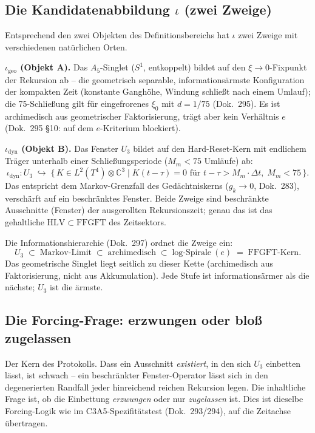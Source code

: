 \subsection*{Die Kandidatenabbildung $\iota$ (zwei Zweige)}

Entsprechend den zwei Objekten des Definitionsbereichs hat $\iota$ zwei
Zweige mit verschiedenen natürlichen Orten.

\textbf{$\iota_{\text{geo}}$ (Objekt A).} Das $A_5$-Singlet ($S^1$,
entkoppelt) bildet auf den $\xi\to 0$-Fixpunkt der Rekursion ab -- die
geometrisch separable, informationsärmste Konfiguration der kompakten Zeit
(konstante Ganghöhe, Windung schließt nach einem Umlauf); die 75-Schließung gilt für eingefrorenes $\xi_0$ mit
$d=1/75$ (Dok.~295). Es ist archimedisch aus
geometrischer Faktorisierung, trägt aber kein Verhältnis $e$ (Dok.~295 §10:
auf dem $e$-Kriterium blockiert).

\textbf{$\iota_{\text{dyn}}$ (Objekt B).} Das Fenster $U_3$ bildet auf den
Hard-Reset-Kern mit endlichem Träger unterhalb einer Schließungsperiode
($M_m < 75$ Umläufe) ab:
\begin{equation}
  \iota_{\text{dyn}}\colon U_3 \;\hookrightarrow\;
  \bigl\{\,K \in L^2(T^4)\otimes\mathbb{C}^3 \;\big|\;
  K(t-\tau) = 0 \text{ für } t-\tau > M_m\cdot\Delta t,\;
  M_m < 75\,\bigr\}.
\end{equation}
Das entspricht dem Markov-Grenzfall des Gedächtniskerns ($g_k\to 0$,
Dok.~283), verschärft auf ein beschränktes Fenster. Beide Zweige sind
beschränkte Ausschnitte (Fenster) der ausgerollten Rekursionszeit; genau
das ist das gehaltliche $\mathrm{HLV}\subset\mathrm{FFGFT}$ des Zeitsektors.

Die Informationshierarchie (Dok.~297) ordnet die Zweige ein:
\begin{equation}
  U_3 \;\subset\; \text{Markov-Limit} \;\subset\;
  \text{archimedisch} \;\subset\; \text{log-Spirale}~(e)
  \;=\; \text{FFGFT-Kern}.
\end{equation}
Das geometrische Singlet liegt seitlich zu dieser Kette (archimedisch aus
Faktorisierung, nicht aus Akkumulation). Jede Stufe ist informationsärmer
als die nächste; $U_3$ ist die ärmste.

\subsection*{Die Forcing-Frage: erzwungen oder bloß zugelassen}

Der Kern des Protokolls. Dass ein Ausschnitt \emph{existiert}, in den sich
$U_3$ einbetten lässt, ist schwach -- ein beschränkter Fenster-Operator
lässt sich in den degenerierten Randfall jeder hinreichend reichen
Rekursion legen. Die inhaltliche Frage ist, ob die Einbettung
\emph{erzwungen} oder nur \emph{zugelassen} ist. Dies ist dieselbe
Forcing-Logik wie im C3A5-Spezifitätstest (Dok.~293/294), auf die Zeitachse
übertragen.

